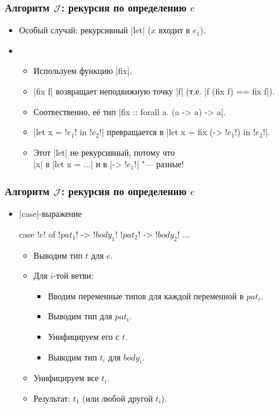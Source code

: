 \documentclass[11pt]{beamer}
\begin{document}
\begin{frame}[fragile]
  \frametitle{Алгоритм $\mathcal{J}$: рекурсия по определению $e$}
  \begin{itemize}
    \item Особый случай: рекурсивный \haskinline|let| ($x$ входит в $e_1$).
          \pause
    \item[]
      \begin{itemize}
        \item Используем функцию \haskinline|fix|.
        \item \haskinline|fix f| возвращает неподвижную точку \haskinline|f| (т.е. \haskinline|f (fix f) == fix f|).
              \pause
        \item Соотвественно, её тип \pause \haskinline|fix :: forall a. (a -> a) -> a|.
              \pause
        \item \haskinline|let x = !$e_1$! in !$e_2$!| превращается в \haskinline|let x = fix (\x -> !$e_1$!) in !$e_2$!|.
        \item Этот \haskinline|let| не рекурсивный, потому что
              \pause
              \\ \haskinline|x| в \haskinline|let x = ...| и в \haskinline|\x -> !$e_1$!| "--- разные!
      \end{itemize}
  \end{itemize}
\end{frame}

\begin{frame}[fragile]
  \frametitle{Алгоритм $\mathcal{J}$: рекурсия по определению $e$}
  \begin{itemize}
    \item \haskinline|case|-выражение
          \begin{haskell}
            case !$e$! of
              !$pat_1$! -> !$body_1$!
              !$pat_2$! -> !$body_2$!
              ...
          \end{haskell}
          \pause
          \begin{itemize}
            \item Выводим тип $t$ для $e$.
            \item Для $i$-той ветви:
                  \begin{itemize}
                    \pause
                    \item Вводим переменные типов для каждой переменной в $pat_i$.
                    \item Выводим тип для $pat_i$.
                          \pause
                    \item Унифицируем его с $t$.
                          \pause
                    \item Выводим тип $t_i$ для $body_i$.
                  \end{itemize}
                  \pause
            \item Унифицируем все $t_i$.
            \item Результат: \pause $t_1$ (или любой другой $t_i$).
          \end{itemize}
  \end{itemize}
\end{frame}
\end{document}
